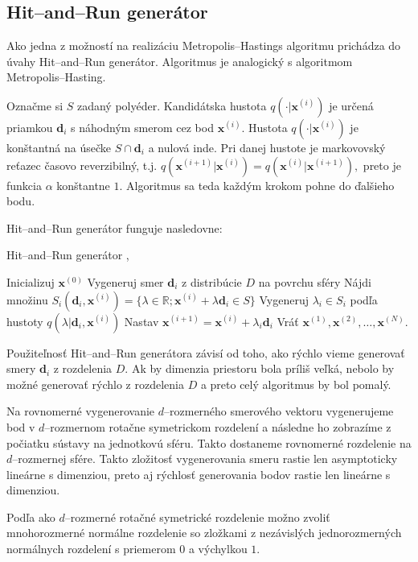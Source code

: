 \subsection{Hit--and--Run generátor}

Ako jedna z možností na realizáciu Metropolis--Hastings algoritmu prichádza do úvahy Hit--and--Run generátor. Algoritmus je analogický s algoritmom Metropolis--Hasting.

Označme si $S$ zadaný polyéder. Kandidátska hustota $q(\cdot|\mathbf x^{(i)})$ je určená priamkou $\mathbf d_i$ s náhodným smerom cez bod $\mathbf x^{(i)}$. Hustota $q(\cdot|\mathbf x^{(i)})$ je konštantná na úsečke $S \cap \mathbf d_i$ a nulová inde. Pri danej hustote je markovovský reťazec časovo reverzibilný, t.j. $q(\mathbf x^{(i+1)}|\mathbf x^{(i)})=q(\mathbf x^{(i)}|\mathbf x^{(i+1)}),$ \cite{hit-and-run_chen} preto je funkcia $\alpha$ konštantne $1$. Algoritmus sa teda každým krokom pohne do ďalšieho bodu.

Hit--and--Run generátor funguje nasledovne:

\begin{algorithm}[H]
	\caption{Hit--and--Run generátor \cite{hit-and-run_chen},\cite{zhluky_lukacek}}
	\label{hit--and--run}
	\begin{algorithmic}[1]
		\State Inicializuj $\mathbf x^{(0)}$
			\State Vygeneruj smer $\mathbf d_i$ z distribúcie $D$ na povrchu sféry
			\State Nájdi množinu $S_i(\mathbf d_i,\mathbf x^{(i)})=\{\lambda \in \mathbb{R}; \mathbf x^{(i)} + \lambda \mathbf d_i \in S \} $
			\State Vygeneruj $\lambda_i \in S_i$ podľa hustoty $q(\lambda | \mathbf d_i, \mathbf x^{(i)})$
			\State Nastav $\mathbf x^{(i+1)}=\mathbf x^{(i)}+\lambda_i \mathbf d_i$
		\EndFor
		\State Vráť $\mathbf x^{(1)},\mathbf x^{(2)},\dots,\mathbf x^{(N)}$.
	\end{algorithmic}
\end{algorithm}

Použiteľnosť Hit--and--Run generátora závisí od toho, ako rýchlo vieme generovať smery $\mathbf d_i$ z rozdelenia $D$. Ak by dimenzia priestoru bola príliš veľká, nebolo by možné generovať rýchlo z rozdelenia $D$ a preto celý algoritmus by bol pomalý. 

Na rovnomerné vygenerovanie $d$--rozmerného smerového vektoru vygenerujeme bod v $d$--rozmernom rotačne symetrickom rozdelení a následne ho zobrazíme z počiatku sústavy na jednotkovú sféru. Takto dostaneme rovnomerné rozdelenie na $d$--rozmernej sfére. Takto zložitosť vygenerovania smeru rastie len asymptoticky lineárne s dimenziou, preto aj rýchlosť generovania bodov rastie len lineárne s dimenziou.

Podľa \cite{decompositional_harman} ako $d$--rozmerné rotačné symetrické rozdelenie možno zvoliť mnohorozmerné normálne rozdelenie so zložkami z nezávislých jednorozmerných normálnych rozdelení s priemerom $0$ a výchylkou $1$.
